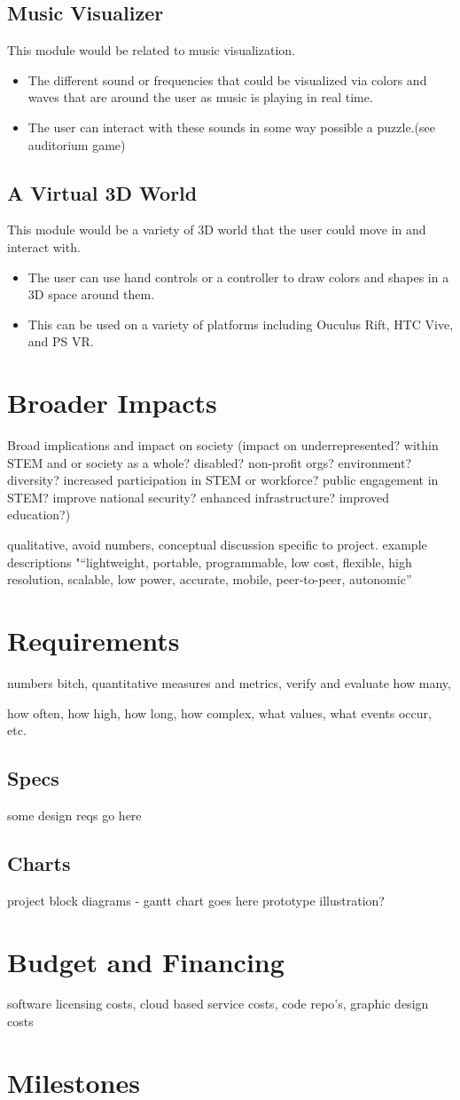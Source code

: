 \documentclass[a4paper,10pt]{article}
\begin{document}
     \subsection{Music Visualizer}
     This module would be related to music visualization. 
     \begin{itemize}
     \item The different sound or frequencies that could be visualized via colors and waves that are around the user as music is playing in real time.
     \item The user can interact with these sounds in some way possible a puzzle.(see auditorium game)
     \end{itemize}   
     \subsection{A Virtual 3D World}
     This module would be a variety of 3D world that the user could move in and interact with. 
     \begin{itemize}
     \item The user can use hand controls or a controller to draw colors and shapes in a 3D space around them. 
     \item This can be used on a variety of platforms including Ouculus Rift, HTC Vive, and PS VR.
     \end{itemize}   


\section{Broader Impacts}
Broad implications and impact on society (impact on underrepresented? within STEM and or society as a whole? disabled? non-profit orgs? environment? diversity? increased participation in STEM or workforce? public engagement in STEM? improve national security? enhanced infrastructure? improved education?)

qualitative, avoid numbers, conceptual discussion specific to project.
example descriptions "“lightweight, portable, programmable, low cost, flexible, high resolution, scalable, low power, accurate, mobile, peer-to-peer, autonomic”


\section{Requirements}
numbers bitch, quantitative measures and metrics, verify and evaluate
how many,

how often, how high, how long, how complex, what values, what events occur, etc.
\subsection{Specs}
some design reqs go here
\subsection{Charts}
project block diagrams - gantt chart goes here
prototype illustration?

\section{Budget and Financing}
software licensing costs, cloud based service costs, code repo's, graphic design costs
\section{Milestones}
\end{document}
